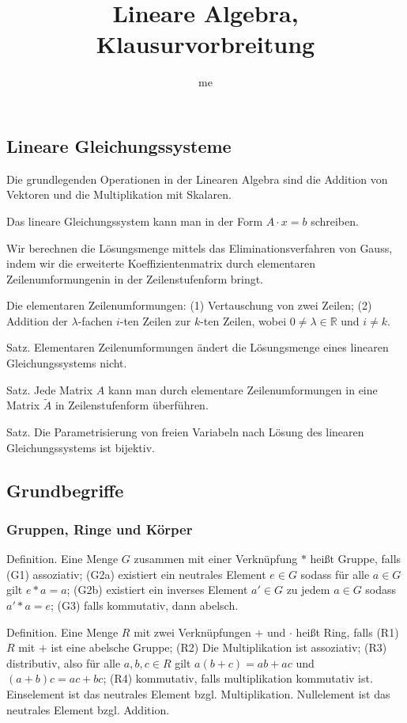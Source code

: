 \documentclass[fleqn,draft,a5paper]{article}
\title{Lineare Algebra, Klausurvorbreitung}
\author{me}
\begin{document}
\subsection{Lineare Gleichungssysteme}
Die grundlegenden Operationen in der Linearen Algebra sind die
Addition von Vektoren und die Multiplikation mit Skalaren.

Das lineare Gleichungssystem kann man in der Form \(A \cdot x = b\)
schreiben.

Wir berechnen die Lösungsmenge
mittels das Eliminationsverfahren von Gauss, indem wir die erweiterte
Koeffizientenmatrix  durch elementaren
Zeilenumformungenin in der Zeilenstufenform bringt.

Die elementaren Zeilenumformungen: (1) Vertauschung von zwei Zeilen;
(2)  Addition der \(\lambda\)-fachen \(i\)-ten Zeilen zur \(k\)-ten Zeilen, wobei
\(0 \ne \lambda \in \mathbb{R}\) und \(i \ne k\).

Satz.  Elementaren Zeilenumformungen ändert die Lösungsmenge eines
linearen Gleichungssystems nicht.

Satz.  Jede Matrix \(A\) kann man durch elementare Zeilenumformungen in
eine Matrix \(\tilde{A}\) in Zeilenstufenform überführen.

Satz.  Die Parametrisierung von freien Variabeln nach Lösung des
linearen Gleichungssystems
ist bijektiv.
\subsection{Grundbegriffe}
\subsubsection{Gruppen, Ringe und Körper}
Definition.  Eine Menge \(G\) zusammen mit einer Verknüpfung \(\ast\) heißt
Gruppe, falls (G1) assoziativ; (G2a) existiert ein neutrales Element
\(e \in G\) sodass für alle \(a \in G\) gilt \(e \ast a = a\); (G2b) existiert ein
inverses Element \(a' \in G\) zu jedem \(a \in G\) sodass \(a' \ast a = e\); (G3)
falls kommutativ, dann abelsch.

Definition.  Eine Menge \(R\) mit zwei Verknüpfungen \(+\) und \(\cdot\) heißt
Ring, falls (R1) \(R\) mit \(+\) ist eine abelsche Gruppe; (R2) Die
Multiplikation ist assoziativ; (R3) distributiv, also für alle \(a,b,c
\in R\) gilt \(a(b+c)=ab+ac\) und \((a+b)c=ac+bc\); (R4) kommutativ, falls
multiplikation kommutativ ist. Einselement ist das neutrales Element
bzgl. Multiplikation.  Nullelement ist das neutrales Element
bzgl. Addition.
\end{document}
